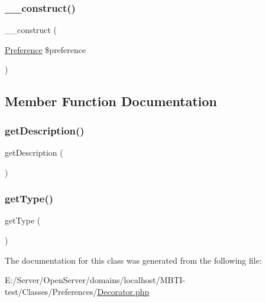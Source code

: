 \subsubsection{\texorpdfstring{\+\_\+\+\_\+construct()}{\_\_construct()}}
{\footnotesize\ttfamily \+\_\+\+\_\+construct (\begin{DoxyParamCaption}\item[{\hyperlink{class_classes_1_1_preferences_1_1_preference}{Preference}}]{\$preference }\end{DoxyParamCaption})}



\subsection{Member Function Documentation}
\mbox{\label{class_classes_1_1_preferences_1_1_decorator_a2e7bb35c71bf1824456ceb944cb7a845}} 
\subsubsection{\texorpdfstring{get\+Description()}{getDescription()}}
{\footnotesize\ttfamily get\+Description (\begin{DoxyParamCaption}{ }\end{DoxyParamCaption})}

\mbox{\label{class_classes_1_1_preferences_1_1_decorator_a830b5c75df72b32396701bc563fbe3c7}} 
\subsubsection{\texorpdfstring{get\+Type()}{getType()}}
{\footnotesize\ttfamily get\+Type (\begin{DoxyParamCaption}{ }\end{DoxyParamCaption})}



The documentation for this class was generated from the following file\+:\begin{DoxyCompactItemize}
\item 
E\+:/\+Server/\+Open\+Server/domains/localhost/\+M\+B\+T\+I-\/test/\+Classes/\+Preferences/\hyperlink{_decorator_8php}{Decorator.\+php}\end{DoxyCompactItemize}
